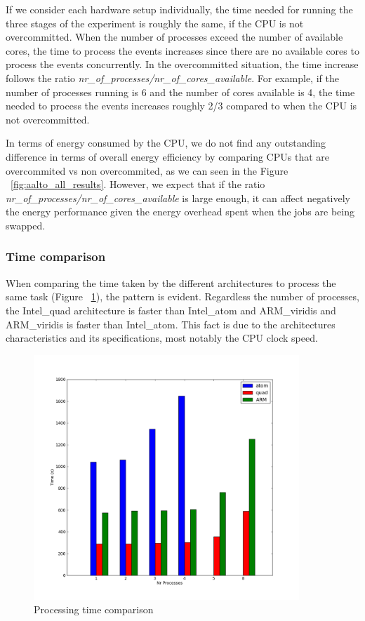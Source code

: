 If we consider each hardware setup individually, the time needed for running the three stages of the experiment is roughly the same, if the CPU is not overcommitted. When
the number of processes exceed the number of available cores, the time to 
process the events increases since there are no available cores to process the
events concurrently. In the overcommitted situation, the time increase follows
the ratio \textit{nr\_of\_processes/nr\_of\_cores\_available}. 
For example, if the
number of processes running is 6 and the number of cores available is 4, the
time needed to process the events increases roughly 2/3 compared to when the
CPU is not overcommitted.

In terms of energy consumed by the CPU, we do not find any outstanding difference in terms of overall energy efficiency by comparing CPUs that are overcommited vs non overcommited, as we can seen in the Figure ~\ref{fig:aalto_all_results}. However, we expect that if the ratio \textit{nr\_of\_processes/nr\_of\_cores\_available} is large enough, it can affect negatively the energy performance given the energy overhead spent when the jobs are being swapped.


\subsubsection*{Time comparison}
When comparing the time taken by the different architectures to process the same
task (Figure ~\ref{fig:aalto_time}), the pattern is evident. 
Regardless the number of processes, the 
Intel\_quad architecture is faster than Intel\_atom and ARM\_viridis and ARM\_viridis is faster than Intel\_atom.
This fact is due to the architectures characteristics and its specifications, most notably the CPU clock speed.\\

\begin{figure}[h]
  \centering
    \includegraphics[width=100mm]{"img/aalto/aalto_all_time"}
    \caption{Processing time comparison}
    \label{fig:aalto_time}
\end{figure}


